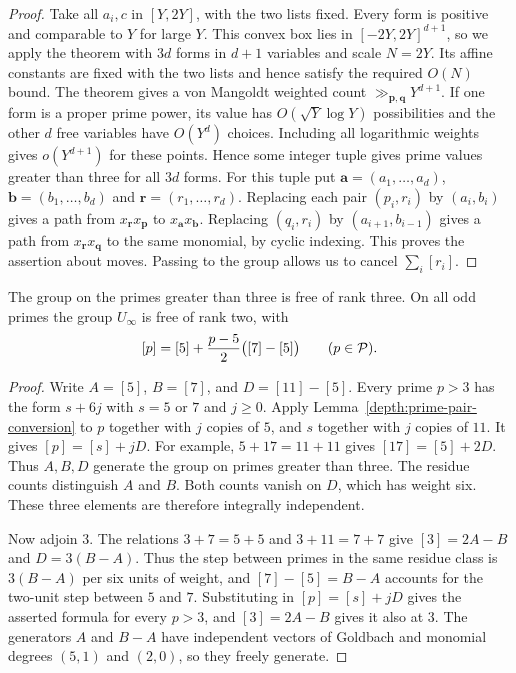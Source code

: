 \begin{proof}
Take all $a_i,c$ in $[Y,2Y]$, with the two lists fixed. Every form
is positive and comparable to $Y$ for large $Y$. This convex box lies
in $[-2Y,2Y]^{d+1}$, so we apply the theorem with $3d$ forms in $d+1$
variables and scale $N=2Y$. Its affine constants are fixed with the
two lists and hence satisfy the required $O(N)$ bound. The theorem gives
a von Mangoldt weighted count $\gg_{\boldsymbol p,\boldsymbol q}Y^{d+1}$. If one form is a
proper prime power, its value has $O(\sqrt Y\log Y)$ possibilities
and the other $d$ free variables have $O(Y^d)$ choices. Including all
logarithmic weights gives $o(Y^{d+1})$ for these points. Hence some
integer tuple gives prime values greater than three for all $3d$ forms.
For this tuple put $\boldsymbol a=(a_1,\ldots,a_d)$,
$\boldsymbol b=(b_1,\ldots,b_d)$ and $\boldsymbol r=(r_1,\ldots,r_d)$.
Replacing each pair $(p_i,r_i)$ by $(a_i,b_i)$ gives a path from
$x_{\boldsymbol r}x_{\boldsymbol p}$ to $x_{\boldsymbol a}x_{\boldsymbol b}$.
Replacing $(q_i,r_i)$ by $(a_{i+1},b_{i-1})$ gives a path from
$x_{\boldsymbol r}x_{\boldsymbol q}$ to the same monomial, by cyclic indexing.
This proves the assertion about moves. Passing to the group allows us to
cancel $\sum_i[r_i]$.
\end{proof}

\begin{theorem}
\label{depth:prime-pair-group}
The group on the primes greater than three is free of rank three.
On all odd primes the group $U_\infty$ is free of rank two,
with
\[
 [p]=[5]+\frac{p-5}{2}\bigl([7]-[5]\bigr)
 \qquad(p\in\mathcal P).
\]
\end{theorem}
\begin{proof}
Write $A=[5]$, $B=[7]$, and $D=[11]-[5]$. Every prime $p>3$ has
the form $s+6j$ with $s=5$ or $7$ and $j\ge0$.
Apply Lemma~\ref{depth:prime-pair-conversion} to $p$ together with $j$
copies of $5$, and $s$ together with $j$ copies of $11$. It gives
$[p]=[s]+jD$. For example, $5+17=11+11$ gives $[17]=[5]+2D$.
Thus $A,B,D$ generate the group on primes greater
than three. The residue counts distinguish $A$ and $B$. Both counts
vanish on $D$, which has weight six. These three elements are
therefore integrally independent.

Now adjoin $3$. The relations $3+7=5+5$ and $3+11=7+7$ give
$[3]=2A-B$ and $D=3(B-A)$. Thus the step between primes in the
same residue class is $3(B-A)$ per six units of weight, and
$[7]-[5]=B-A$ accounts for the two-unit step between $5$ and $7$.
Substituting in $[p]=[s]+jD$ gives the asserted formula for every
$p>3$, and $[3]=2A-B$ gives it also at $3$. The generators $A$ and
$B-A$ have independent vectors of Goldbach and monomial degrees
$(5,1)$ and $(2,0)$, so
they freely generate.
\end{proof}

